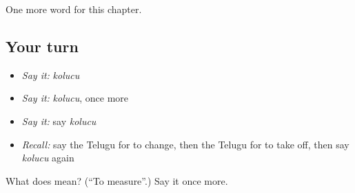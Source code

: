 \begin{grammarlens}[title={What you've built}]
One more word for this chapter.
\end{grammarlens}

\subsection*{Your turn}
\begin{itemize}
\raggedright
  \item \emph{Say it:} \emph{kolucu}
  \item \emph{Say it:} \emph{kolucu}, once more
  \item \emph{Say it:} say \emph{kolucu}
  \item \emph{Recall:} say the Telugu for to change, then the Telugu for to take off, then say \emph{kolucu} again
\end{itemize}

\begin{tcolorbox}[breakable,colback=teal!4,colframe=teal!35!black,title={Before you move on}]
What does  mean? (\textquotedblleft{}To measure\textquotedblright{}.) Say it once more.
\end{tcolorbox}
